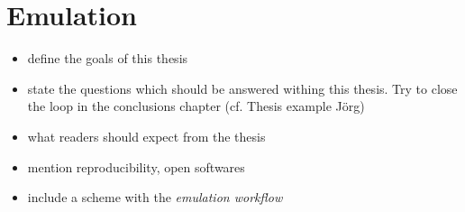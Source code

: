 \section{Emulation}

\begin{itemize}
\itemsep0em
  \item define the goals of this thesis
  \item state the questions which should be answered withing this thesis. Try to close the loop in the conclusions chapter (cf. Thesis example Jörg)
  \item what readers should expect from the thesis
  \item mention reproducibility, open softwares
  \item include a scheme with the \emph{emulation workflow}
\end{itemize}








